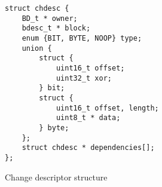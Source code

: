 \begin{figure}
\begin{verbatim}
struct chdesc {
    BD_t * owner;
    bdesc_t * block;
    enum {BIT, BYTE, NOOP} type;
    union {
        struct {
            uint16_t offset;
            uint32_t xor;
        } bit;
        struct {
            uint16_t offset, length;
            uint8_t * data;
        } byte;
    };
    struct chdesc * dependencies[];
};
\end{verbatim}
\caption{\label{fig:chdesc} Change descriptor structure}
\end{figure}